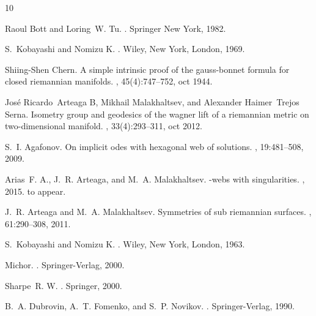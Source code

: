 \documentclass[12pt,letterpaper]{amsart}
\theoremstyle{definition}
\theoremstyle{plain}
\theoremstyle{remark}
\begin{document}
\begin{thebibliography}{10}

Raoul Bott and Loring~W. Tu.
.
\newblock Springer New York, 1982.

S.~Kobayashi and Nomizu K.
.
\newblock Wiley, New York, London, 1969.

Shiing-Shen Chern.
\newblock A simple intrinsic proof of the gauss-bonnet formula for closed
  riemannian manifolds.
, 45(4):747--752, oct 1944.

Jos{\'{e}} Ricardo~Arteaga B, Mikhail Malakhaltsev, and Alexander Haimer~Trejos
  Serna.
\newblock Isometry group and geodesics of the wagner lift of a riemannian
  metric on two-dimensional manifold.
, 33(4):293--311, oct 2012.

S.~I. Agafonov.
\newblock On implicit odes with hexagonal web of solutions.
, 19:481--508, 2009.

Arias~F. A., J.~R. Arteaga, and M.~A. Malakhaltsev.
-webs with singularities.
, 2015.
\newblock to appear.

J.~R. Arteaga and M.~A. Malakhaltsev.
\newblock Symmetries of sub riemannian surfaces.
, 61:290--308, 2011.

S.~Kobayashi and Nomizu K.
.
\newblock Wiley, New York, London, 1963.

Michor.
.
\newblock Springer-Verlag, 2000.

Sharpe~R. W.
.
\newblock Springer, 2000.

B.~A. Dubrovin, A.~T. Fomenko, and S.~P. Novikov.
.
\newblock Springer-Verlag, 1990.

\end{thebibliography}
\end{document}
